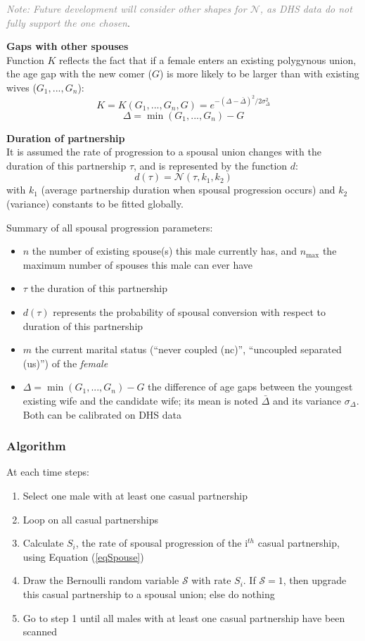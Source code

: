 \documentclass[11pt, onecolumn]{article}
\newcommand{\note}[1]{\textit{\textcolor{Grey}{Note: #1}}}
\begin{document}
\note{Future development will consider other shapes for $\mathcal{N}$, as DHS data do not fully support the one chosen}.


\textbf{Gaps with other spouses}\\
Function $K$ reflects the fact that if a female enters an existing polygynous union, the age gap with the new comer ($G$) is more likely to be larger than with existing wives ($G_1,...,G_n$):
$$K = K(G_{1},...,G_{n},G) = e^{-(\Delta-\bar{\Delta})^2/2\sigma_\Delta^2}$$ 
$$\Delta = \min(G_1,...,G_n)-G$$

\textbf{Duration of partnership}\\
It is assumed the rate of progression to a spousal union changes with the duration of this partnership $\tau$, and is represented by the function $d$:
$$d(\tau) =  \mathcal{N}(\tau,k_1,k_2)$$
with $k_1$ (average partnership duration when spousal progression occurs) and $k_2$ (variance) constants to be fitted globally.

Summary of all spousal progression parameters:
\begin{itemize}
\item $n$ the number of existing spouse(s) this male currently has, and $n_{\mathrm{max}}$ the maximum number of spouses this male can ever have
\item $\tau$ the duration of this partnership
\item $d(\tau)$ represents the probability of spousal conversion with respect to duration of this partnership
\item $m$ the current marital status (``never coupled (nc)'', ``uncoupled separated (us)'') of the \emph{female}
\item $\Delta = \min(G_1,...,G_n)-G$ the difference of age gaps between the youngest existing wife and the candidate wife; its mean is noted $\bar{\Delta}$ and its variance $\sigma_\Delta$. Both can be calibrated on DHS data
\end{itemize}

\subsubsection{Algorithm}

At each time steps:
\begin{enumerate} 
\item Select one male with at least one casual partnership
\item Loop on all casual partnerships
\item Calculate $S_i$, the rate of spousal progression of the i$^{th}$ casual partnership, using Equation (\ref{eqSpouse})
\item Draw the Bernoulli random variable $\mathcal{S}$ with rate $S_i$. If $\mathcal{S}=1$, then upgrade this casual partnership to a spousal union; else do nothing
\item Go to step 1 until all males with at least one casual partnership have been scanned
\end{enumerate}
\end{document}
